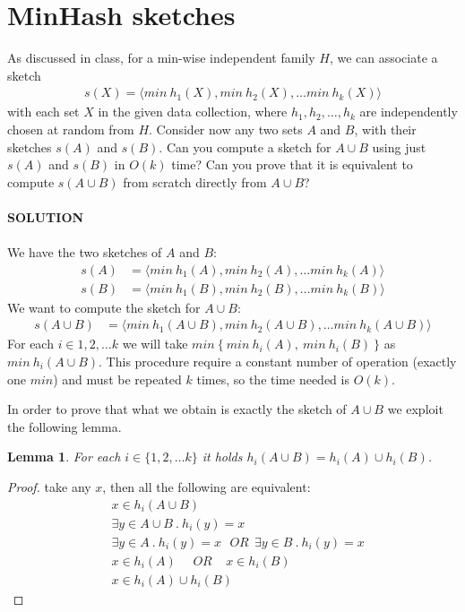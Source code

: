 \documentclass[a4paper]{article}
\newtheorem{lemma}[theorem]{Lemma}
\begin{document}
\section*{MinHash sketches}
As  discussed  in  class,  for  a  min-wise  independent  family $H$, we can associate a sketch
\begin{align*}
s(X) = \langle min\ h_1(X), min\ h_2(X), \dots min\ h_k(X) \rangle
\end{align*}
with each set $X$ in the given data collection, where $h_1, h_2 , \dots, h_k$ are independently chosen at random from $H$. 
Consider now any two sets $A$ and $B$, with their sketches $s(A)$ and $s(B)$. 
Can you compute a sketch for $A \cup B$ using just $s(A)$ and $s(B)$ in $O(k)$ time?
Can you prove that it is equivalent to compute $s(A \cup B)$ from scratch directly from $A \cup B$?
\\
\\
\textbf{SOLUTION}
\\
\\
We have the two sketches of $A$ and $B$:
\begin{align*}
s(A) &= \langle min\ h_1(A), min\ h_2(A), \dots min\ h_k(A) \rangle \\
s(B) &= \langle min\ h_1(B), min\ h_2(B), \dots min\ h_k(B) \rangle
\end{align*}
We want to compute the sketch for $A \cup B$:
\begin{align*}
s(A \cup B) &= \langle min\ h_1(A \cup B), min\ h_2(A \cup B), \dots min\ h_k(A \cup B) \rangle
\end{align*}
For each $i \in {1, 2, \dots k}$ we will take $min\ \{\ min\ h_i(A),\ min\ h_i(B)\ \}$ as $min\ h_i(A \cup B)$.
This procedure require a constant number of operation (exactly one $min$) and must be repeated $k$ times, so the time needed is $O(k)$.

In order to prove that what we obtain is exactly the sketch of $A \cup B$ we exploit the following lemma.
\begin{lemma}
For each $i \in \{ 1, 2, \dots k\}$ it holds $h_i(A \cup B) = h_i(A) \cup h_i(B)$.
\end{lemma}
\begin{proof}
take any $x$, then all the following are equivalent:
\begin{align*}
& x \in h_i(A \cup B) \\
& \exists y \in A \cup B\ .\ h_i(y) = x \\
& \exists y \in A\ .\ h_i(y) = x \ \ \ OR \ \ \exists y \in B\ .\ h_i(y) = x \\
& x \in h_i(A) \ \ \ \ \ \ OR \ \ \ \ \ x \in h_i(B) \\
& x \in h_i(A) \cup h_i(B)
\end{align*}
\end{proof}
\end{document}
